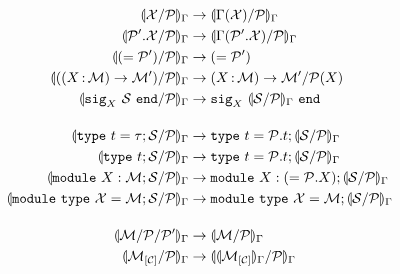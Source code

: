 \begin{align*}
  \Ostrengthen{\E}{\iP}{\iX}
  &\to \Ostrengthen{\E}{\iP}{\lookup{\E}{\iX}}\\
  \Ostrengthen{\E}{\iP}{\iP'.\iX}
  &\to \Ostrengthen{\E}{\iP}{\lookup{\E}{\iP'.\iX}}\\
  \Ostrengthen{\E}{\iP}{\Salias{\iP'}}
  &\to \Salias{\iP'}\\
  \Ostrengthen{\E}{\iP}{(\Sfunctor{\ix}{\iM}{\iM'})}
  &\to \Sfunctor{\ix}{\iM}{\Sstrengthen{\iP(X)}{\iM'}}\\
  \Ostrengthen{\E}{\iP}{\Ssig{\ix}{\iS}}
  &\to \Ssig{\ix}{\Ostrengthen{\E}{\iP}{\iS}}\\[4mm]
  \Ostrengthen{\E}{\iP}{\Stype{t}{\tau};\iS}
  &\to \Stype{t}{\iP.t};\Ostrengthen{\E}{\iP}{\iS} %
  \\
  \Ostrengthen{\E}{\iP}{\Stypeabs{t};\iS}
  &\to \Stype{t}{\iP.t};\Ostrengthen{\E}{\iP}{\iS} %
  \\
  \Ostrengthen{\E}{\iP}{\Smodulety{\ix}{\iM};\iS}
  &\to \Smodulety{\ix}{\Salias{\iP.\ix}};
    \Ostrengthen{\E}{\iP}{\iS} %
  \\
  \Ostrengthen{\E}{\iP}{\Smoduletype{\iX}{\iM};\iS}
  &\to \Smoduletype{\iX}{\iM};
    \Ostrengthen{\E}{\iP}{\iS} \\[4mm]
  \Ostrengthen{\E}{\iP'}{\Sstrengthen{\iP}{\iM}}
  &\to \Ostrengthen{\E}{\iP}{\iM}\\
  \Ostrengthen{\E}{\iP}{\Senrich{\iC}{\iM}}
  &\to \Ostrengthen{\E}{\iP}{\Oenrich{\E}{\iC}{\iM}}\\
\end{align*}\vspace{-3mm}

